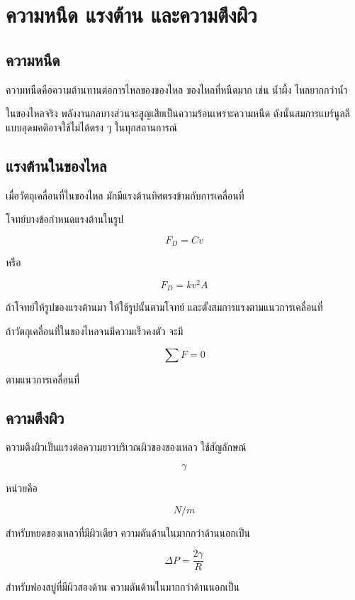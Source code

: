 \section{ความหนืด แรงต้าน และความตึงผิว}

\subsection{ความหนืด}

ความหนืดคือความต้านทานต่อการไหลของของไหล ของไหลที่หนืดมาก เช่น น้ำผึ้ง ไหลยากกว่าน้ำ

ในของไหลจริง พลังงานกลบางส่วนจะสูญเสียเป็นความร้อนเพราะความหนืด ดังนั้นสมการแบร์นูลลีแบบอุดมคติอาจใช้ไม่ได้ตรง ๆ ในทุกสถานการณ์

\subsection{แรงต้านในของไหล}

เมื่อวัตถุเคลื่อนที่ในของไหล มักมีแรงต้านทิศตรงข้ามกับการเคลื่อนที่

โจทย์บางข้อกำหนดแรงต้านในรูป

\[
F_D=Cv
\]

หรือ

\[
F_D=kv^2A
\]

ถ้าโจทย์ให้รูปของแรงต้านมา ให้ใช้รูปนั้นตามโจทย์ และตั้งสมการแรงตามแนวการเคลื่อนที่

\begin{tcolorbox}[title=แรงต้านกับความเร็วคงตัว]
ถ้าวัตถุเคลื่อนที่ในของไหลจนมีความเร็วคงตัว จะมี

\[
\sum F=0
\]

ตามแนวการเคลื่อนที่
\end{tcolorbox}

\subsection{ความตึงผิว}

ความตึงผิวเป็นแรงต่อความยาวบริเวณผิวของของเหลว ใช้สัญลักษณ์

\[
\gamma
\]

หน่วยคือ

\[
\si{N/m}
\]

สำหรับหยดของเหลวที่มีผิวเดียว ความดันด้านในมากกว่าด้านนอกเป็น

\[
\Delta P=\frac{2\gamma}{R}
\]

สำหรับฟองสบู่ที่มีผิวสองด้าน ความดันด้านในมากกว่าด้านนอกเป็น

